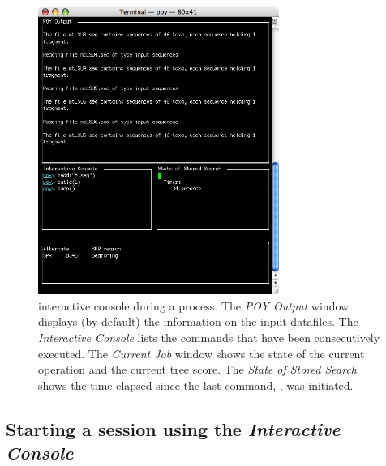 \begin{figure}[htbp]
   \centering
   \includegraphics[width=0.7\textwidth]{figures/figprocess.jpg}
   \caption{\poy interactive console during a process. The \emph{POY Output} window displays (by default) the information on the input datafiles. The \emph{Interactive Console} lists the commands that have been consecutively executed. The \emph{Current Job} window shows the state of the current operation and the current tree score. The \emph{State of Stored Search} shows the time elapsed  since the last command, , was initiated.}
   \label{fig:figprocess}
\end{figure}


\subsection{Starting a \poy session using the \emph{Interactive Console}}

